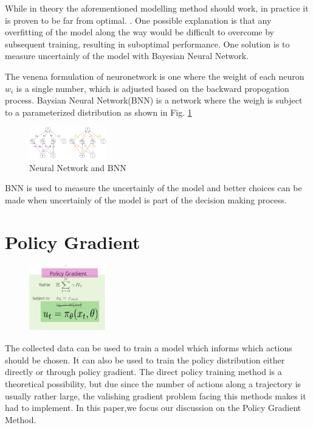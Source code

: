 \documentclass[journal]{IEEEtran}
\begin{document}
While in theory the aforementioned modelling method should work, in practice it is proven to be far from optimal.  \cite{8463189}. One possible explanation is that any overfitting of the model along the way would be difficult to overcome by subsequent training, resulting in suboptimal performance. One solution is to measure uncertainly of the model with Bayesian Neural Network.

The venena formulation of neuronetwork is one where the weight of each neuron $w_i$ is a single number, which is adjusted based on the backward propogation process. Baysian Neural Network(BNN) is a network where the weigh is subject to a parameterized distribution as shown in Fig. \ref{fig:2}
\begin{figure}[H]
    \centering
    \includegraphics[width=0.3\textwidth]{bnn.png}
    \caption{Neural Network and BNN}
    \label{fig:2}
\end{figure}


BNN is used to measure the uncertainly of the model and better choices can be made when uncertainly of the model is part of the decision making process. \cite{Blundell2015WeightUI}

\section{Policy Gradient}
\begin{figure}[H]
    \centering
    \includegraphics[width=0.3\textwidth]{Control2.png}
    \label{fig:SI}
\end{figure}

The collected data can be used to train a model which informs which actions should be chosen. It can also be used to train the policy distribution either directly or through policy gradient. The direct policy training method is a theoretical possibility, but due since the number of actions along a trajectory is usually rather large, the valishing gradient problem facing this methods makes it had to implement. In this paper,we focus our discussion on the Policy Gradient Method.
\end{document}

